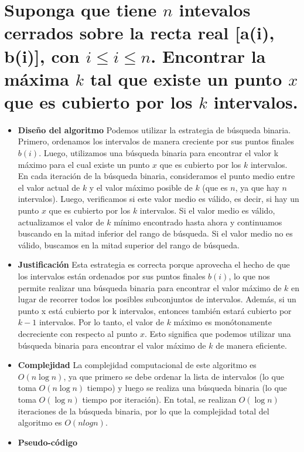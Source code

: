 \section{Suponga que tiene $n$ intevalos cerrados sobre la recta real [a(i), b(i)], con $i \leq i \leq n$. Encontrar la máxima $k$ tal que existe un punto $x$ que es cubierto por los $k$ intervalos.}

\begin{itemize}
  \item \textbf{Diseño del algoritmo}
  Podemos utilizar la estrategia de búsqueda binaria. Primero, ordenamos los intervalos de manera creciente por sus puntos finales $b(i)$. Luego, utilizamos una búsqueda binaria para encontrar el valor k máximo para el cual existe un punto $x$ que es cubierto por los $k$ intervalos. En cada iteración de la búsqueda binaria, consideramos el punto medio entre el valor actual de $k$ y el valor máximo posible de $k$ (que es $n$, ya que hay $n$ intervalos). Luego, verificamos si este valor medio es válido, es decir, si hay un punto $x$ que es cubierto por los $k$ intervalos. Si el valor medio es válido, actualizamos el valor de $k$ mínimo encontrado hasta ahora y continuamos buscando en la mitad inferior del rango de búsqueda. Si el valor medio no es válido, buscamos en la mitad superior del rango de búsqueda.

  \item \textbf{Justificación} 
  Esta estrategia es correcta porque aprovecha el hecho de que los intervalos están ordenados por sus puntos finales $b(i)$, lo que nos permite realizar una búsqueda binaria para encontrar el valor máximo de $k$ en lugar de recorrer todos los posibles subconjuntos de intervalos. Además, si un punto x está cubierto por k intervalos, entonces también estará cubierto por $k-1$ intervalos. Por lo tanto, el valor de $k$ máximo es monótonamente decreciente con respecto al punto $x$. Esto significa que podemos utilizar una búsqueda binaria para encontrar el valor máximo de $k$ de manera eficiente.

  \item \textbf{Complejidad}
  La complejidad computacional de este algoritmo es $O(n \log n)$, ya que primero se debe ordenar la lista de intervalos (lo que toma $O(n \log n)$ tiempo) y luego se realiza una búsqueda binaria (lo que toma $O(\log n)$ tiempo por iteración). En total, se realizan $O(\log n)$ iteraciones de la búsqueda binaria, por lo que la complejidad total del algoritmo es $O(n log n)$.
  \newpage
  \item \textbf{Pseudo-código}


\end{itemize}
